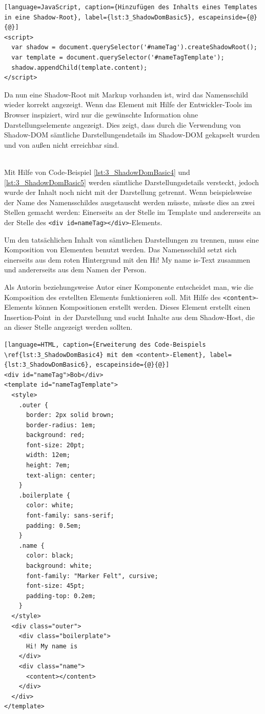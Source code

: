 \begin{enumerate}
\begin{lstlisting}[language=JavaScript, caption={Hinzufügen des Inhalts eines Templates in eine Shadow-Root}, label={lst:3_ShadowDomBasic5}, escapeinside={@}{@}]
<script>
  var shadow = document.querySelector('#nameTag').createShadowRoot();
  var template = document.querySelector('#nameTagTemplate');
  shadow.appendChild(template.content);
</script>
\end{lstlisting}

Da nun eine Shadow-Root mit Markup vorhanden ist, wird das Namensschild wieder korrekt angezeigt. Wenn das Element mit Hilfe der Entwickler-Tools im Browser inspiziert, wird nur die gewünschte Information ohne Darstellungselemente angezeigt. Dies zeigt, dass durch die Verwendung von Shadow-DOM sämtliche Darstellungendetails im Shadow-DOM gekapselt wurden und von außen nicht erreichbar sind.

 \hfill \\
Mit Hilfe von Code-Beispiel \ref{lst:3_ShadowDomBasic4} und \ref{lst:3_ShadowDomBasic5} werden sämtliche Darstellungsdetails versteckt, jedoch wurde der Inhalt noch nicht mit der Darstellung getrennt. Wenn beispielsweise der Name des Namensschildes ausgetauscht werden müsste, müsste dies an zwei Stellen gemacht werden: Einerseits an der Stelle im Template und andererseits an der Stelle des \lstinline|<div id=nameTag></div>|-Elements.

Um den tatsächlichen Inhalt von sämtlichen Darstellungen zu trennen, muss eine Komposition von Elementen benutzt werden. Das Namensschild setzt sich einerseits aus dem roten Hintergrund mit den \glqq Hi! My name is\grqq -Text zusammen und andererseits aus dem Namen der Person.

Als Autorin beziehungsweise Autor einer Komponente entscheidet man, wie die Komposition des erstellten Elements funktionieren soll. Mit Hilfe des \lstinline|<content>|-Elements können Kompositionen erstellt werden. Dieses Element erstellt einen \glqq Insertion-Point\grqq\ in der Darstellung und sucht Inhalte aus dem Shadow-Host, die an dieser Stelle angezeigt werden sollten.

\begin{lstlisting}[language=HTML, caption={Erweiterung des Code-Beispiels \ref{lst:3_ShadowDomBasic4} mit dem <content>-Element}, label={lst:3_ShadowDomBasic6}, escapeinside={@}{@}]
<div id="nameTag">Bob</div>
<template id="nameTagTemplate">
  <style>
    .outer {
      border: 2px solid brown;
      border-radius: 1em;
      background: red;
      font-size: 20pt;
      width: 12em;
      height: 7em;
      text-align: center;
    }
    .boilerplate {
      color: white;
      font-family: sans-serif;
      padding: 0.5em;
    }
    .name {
      color: black;
      background: white;
      font-family: "Marker Felt", cursive;
      font-size: 45pt;
      padding-top: 0.2em;
    }
  </style>
  <div class="outer">
    <div class="boilerplate">
      Hi! My name is
    </div>
    <div class="name">
      <content></content>
    </div>
  </div>
</template>
\end{lstlisting}


\end{enumerate}
